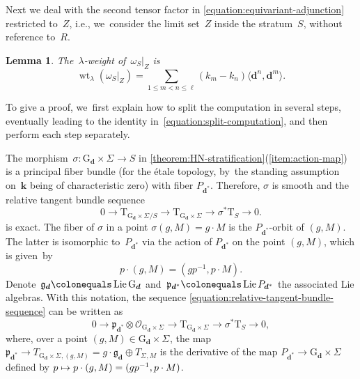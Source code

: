\documentclass[11pt]{article}
\newcommand\mto{\mathchoice{\longmapsto}{\mapsto}{\mapsto}{\mapsto}}
\theoremstyle{plain}
\newtheorem{lemma}[theorem]{Lemma}
\theoremstyle{definition}
\DeclareMathOperator\weight{wt}
\newcommand\blade[1][]{\Sigma_{#1}}
\newcommand\field{\mathbf{k}}
\newcommand\group[1][\tuple{d}]{\mathrm{G}_{#1}}
\newcommand\tangent{\ensuremath{\mathrm{T}}}
\newcommand\tuple[1]{\ensuremath{{\boldsymbol{#1}}}}
\begin{document}
Next we deal with the second tensor factor in \eqref{equation:equivariant-adjunction}
restricted to~$Z$,
i.e., we~consider the limit set~$Z$ inside the stratum~$S$,
without reference to~$R$.
\begin{lemma}
\label{lemma:omega-SZ-weight}
The~$\lambda$-weight of~$\omega_S|_Z$ is
\begin{equation}
\weight_{\lambda}(\omega_S|_Z) = \sum_{1\leq m<n\leq\ell}(k_m-k_n)\langle \tuple{d}^n,\tuple{d}^m\rangle.
\end{equation}
\end{lemma}
To give a proof, we~first explain how to split the computation in several steps,
eventually leading to the identity in~\eqref{equation:split-computation},
and then perform each step separately.

The morphism~$\sigma\colon \group \times \blade \to S$
in \cref{theorem:HN-stratification}(\ref{item:action-map})
is a principal fiber bundle (for the étale topology, by~the standing assumption on~$\field$ being of characteristic zero)
with fiber $P_{\tuple{d}^*}$.
Therefore, $\sigma$ is smooth and the relative tangent bundle sequence
\begin{equation}
\label{equation:relative-tangent-bundle-sequence}
0
\to\tangent_{\group \times \blade/S}
\to\tangent_{\group \times \blade}
\to\sigma^*\tangent_{S}
\to0.
\end{equation}
is exact.
The fiber of $\sigma$ in a point $\sigma(g,M) = g\cdot M$ is the $P_{\tuple{d}^*}$-orbit of $(g,M)$.
The latter is isomorphic to~$P_{\tuple{d}^*}$ via the action of $P_{\tuple{d}^*}$ on the point $(g,M)$, which is given~by
\begin{equation*}
p \cdot (g,M) = (gp^{-1}, p\cdot M).
\end{equation*}
Denote~$\mathfrak{g}_{\tuple{d}}\colonequals\operatorname{Lie}\group$
and~$\mathfrak{p}_{\tuple{d}^*}\colonequals\operatorname{Lie}P_{\tuple{d}^*}$
the associated Lie algebras.
With this notation,
the sequence \eqref{equation:relative-tangent-bundle-sequence} can be written as
\begin{equation}
\label{equation:relative-tangent-bundle-sequence-rewritten}
0
\to\mathfrak{p}_{\tuple{d}^*} \otimes \mathcal{O}_{\group \times \blade}
\to\tangent_{\group \times \blade}
\to\sigma^*\tangent_{S}
\to0,
\end{equation}
where, over a point $(g,M) \in \group \times \blade$,
the map $\mathfrak{p}_{\tuple{d}^*} \to T_{\group \times \blade,(g,M)} = g\cdot \mathfrak{g}_{\tuple{d}} \oplus T_{\blade,M}$
is the derivative of the map $P_{\tuple{d}^*} \to \group \times \blade$
defined by $p \mto p\cdot (g,M) = (gp^{-1}, p\cdot M)$.
\end{document}
